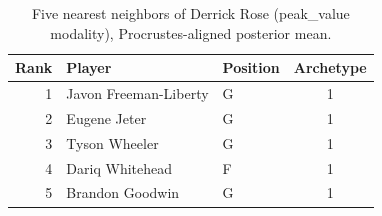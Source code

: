 \begin{table}[htbp]
  \centering\small
  \begin{tabular}{rllc}
    \toprule
    Rank & Player & Position & Archetype \\
    \midrule
    1 & Javon Freeman-Liberty & G & 1 \\
    2 & Eugene Jeter & G & 1 \\
    3 & Tyson Wheeler & G & 1 \\
    4 & Dariq Whitehead & F & 1 \\
    5 & Brandon Goodwin & G & 1 \\
    \bottomrule
  \end{tabular}
  \caption{Five nearest neighbors of Derrick Rose (peak_value modality), Procrustes-aligned posterior mean.}
  \label{tab:Derrick_Rose_neighbors_peak_value}
\end{table}

